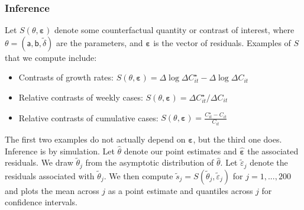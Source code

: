 \documentclass[11pt,reqno,letter]{amsart}
\theoremstyle{definition}
\begin{document}

\subsubsection*{Inference}

Let $S(\theta, \mathbf{\varepsilon})$ denote some counterfactual
quantity or contrast of interest, where $\theta = (\mathsf{a},
\mathsf{b}, \tilde{\delta})$ are the parameters, and
$\mathbf{\varepsilon}$ is the vector of residuals. Examples of $S$
that we compute include:

\begin{itemize}
\item Contrasts of growth rates: $S(\theta, \mathbf{\varepsilon}) =
  \Delta \log \Delta C_{it}^\star - \Delta \log \Delta C_{it}$

\item Relative contrasts of weekly cases: $S(\theta, \mathbf{\varepsilon}) =
  \Delta C_{it}^\star/\Delta C_{it}$

\item Relative contrasts of cumulative cases: $S(\theta, \mathbf{\varepsilon}) =
  \frac{C_{it}^\star - C_{it}}{C_{it}}$
\end{itemize}

The first two examples do not actually depend on
$\mathbf{\varepsilon}$, but the third one does. Inference is by
simulation. Let $\hat{\theta}$ denote our point estimates and
$\hat{\mathbf{\varepsilon}}$ the associated residuals. We draw
$\tilde{\theta}_j$ from the asymptotic distribution of
$\hat{\theta}$. Let $\tilde{\varepsilon}_j$ denote the
residuals associated with $\tilde{\theta}_j$. We then compute
$ \tilde{s}_j = S(\tilde{\theta}_j, \tilde{\varepsilon}_j) $
for $j=1,..., 200$ and plots the mean across $j$ as a point estimate
and quantiles across $j$ for confidence intervals.
\end{document}
